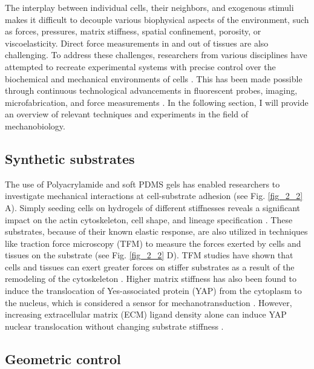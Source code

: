 The interplay between individual cells, their neighbors, and exogenous stimuli makes it difficult to decouple various biophysical aspects of the environment, such as forces, pressures, matrix stiffness, spatial confinement, porosity, or viscoelasticity. Direct force measurements in and out of tissues are also challenging. To address these challenges, researchers from various disciplines have attempted to recreate experimental systems with precise control over the biochemical and mechanical environments of cells \cite{xi2018}. This has been made possible through continuous technological advancements in fluorescent probes, imaging, microfabrication, and force measurements \cite{roca-cusachs2017}. In the following section, I will provide an overview of relevant techniques and experiments in the field of mechanobiology.

\hypertarget{synthetic-substrates}{%
\subsection{Synthetic substrates}\label{synthetic-substrates}}

The use of Polyacrylamide and soft PDMS gels has enabled researchers to investigate mechanical interactions at cell-substrate adhesion (see Fig. \ref{fig_2_2} A). Simply seeding cells on hydrogels of different stiffnesses reveals a significant impact on the actin cytoskeleton, cell shape, and lineage specification \cite{yeung2005,  engler2006}. These substrates, because of their known elastic response, are also utilized in techniques like traction force microscopy (TFM) to measure the forces exerted by cells and tissues on the substrate \cite{harris1980,  gomez-gonzalez2020} (see Fig. \ref{fig_2_2} D). TFM studies have shown that cells and tissues can exert greater forces on stiffer substrates as a result of the remodeling of the cytoskeleton \cite{elosegui-artola2016}. Higher matrix stiffness has also been found to induce the translocation of Yes-associated protein (YAP) from the cytoplasm to the nucleus, which is considered a sensor for mechanotransduction \cite{elosegui-artola2017}. However, increasing extracellular matrix (ECM) ligand density alone can induce YAP nuclear translocation without changing substrate stiffness \cite{stanton2019}.

\hypertarget{geometric-control}{%
\subsection{Geometric control}\label{geometric-control}}

